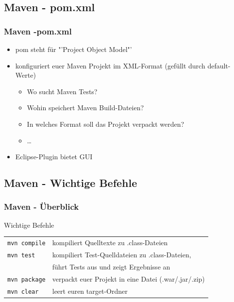\documentclass[18pt]{beamer}
\begin{document}
	\subsection{Maven - pom.xml}
	\begin{frame}
		\frametitle{Maven -pom.xml}
		\begin{itemize}
			\item pom steht für "'Project Object Model"'
			\item konfiguriert euer Maven Projekt im XML-Format (gefüllt durch default-Werte)
			\begin{itemize}
				\item Wo sucht Maven Tests?
				\item Wohin speichert Maven Build-Dateien?
				\item In welches Format soll das Projekt verpackt werden?
				\item \dots
			\end{itemize}
			\item Eclipse-Plugin bietet GUI
		\end{itemize}
	\end{frame}
	
	\subsection{Maven - Wichtige Befehle}
	\begin{frame}
		\frametitle{Maven - Überblick}
		\begin{block}{Wichtige Befehle}
			\begin{tabular}{ll}
				\texttt{mvn compile} & kompiliert Quelltexte zu .class-Dateien \\
				\texttt{mvn test} & kompiliert Test-Quelldateien zu .class-Dateien, \\ & führt Tests aus und zeigt Ergebnisse an \\
				\texttt{mvn package} & verpackt euer Projekt in eine Datei (.war/.jar/.zip) \\ 
				\texttt{mvn clear} & leert euren target-Ordner \\
			\end{tabular}
		\end{block}
	\end{frame}
	
\end{document}
